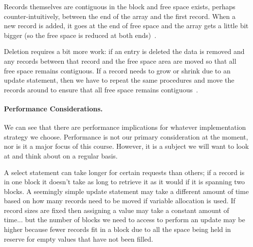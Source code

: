Records themselves are contiguous in the block and free space exists, perhaps counter-intuitively, between the end of the array and the first record. When a new record is added, it goes at the end of free space and the array gets a little bit bigger (so the free space is reduced at both ends)~\cite{dsc}. 

Deletion requires a bit more work: if an entry is deleted the data is removed and any records between that record and the free space area are moved so that all free space remains contiguous. If a record needs to grow or shrink due to an update statement, then we have to repeat the same procedures and move the records around to ensure that all free space remains contiguous~\cite{dsc}. 

\paragraph{Performance Considerations.}

We can see that there are performance implications for whatever implementation strategy we choose. Performance is not our primary consideration at the moment, nor is it a major focus of this course. However, it is a subject we will want to look at and think about on a regular basis. 

 A select statement can take longer for certain requests than others; if a record is in one block it doesn't take as long to retrieve it as it would if it is spanning two blocks. A seemingly simple update statement may take a different amount of time based on how many records need to be moved if variable allocation is used. If record sizes are fixed then assigning a value may take a constant amount of time... but the number of blocks we need to access to perform an update may be higher because fewer records fit in a block due to all the space being held in reserve for empty values that have not been filled.







